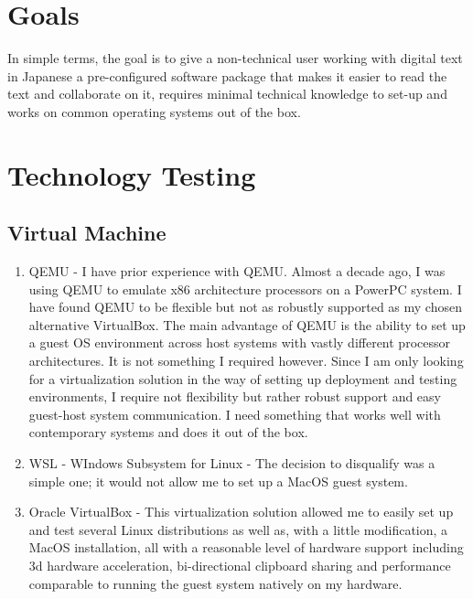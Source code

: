 \documentclass{article}
\begin{document}
\section{Goals}
In simple terms, the goal is to give a non-technical user working with digital text in Japanese a pre-configured software package that makes it easier to read the text and collaborate on it, requires minimal technical knowledge to set-up and works on common operating systems out of the box.

\section {Technology Testing}
\subsection{Virtual Machine}
\begin{enumerate}
    \item QEMU - I have prior experience with QEMU. Almost a decade ago, I was using QEMU to emulate x86 architecture processors on a PowerPC system. I have found QEMU to be flexible but not as robustly supported as my chosen alternative VirtualBox. The main advantage of QEMU is the ability to set up a guest OS environment across host systems with vastly different processor architectures. It is not something I required however. Since I am only looking for a virtualization solution in the way of setting up deployment and testing environments, I require not flexibility but rather robust support and easy guest-host system communication. I need something that works well with contemporary systems and does it out of the box.
    \item WSL - WIndows Subsystem for Linux - The decision to disqualify was a simple one; it would not allow me to set up a MacOS guest system.
    \item Oracle VirtualBox - This virtualization solution allowed me to easily set up and test several Linux distributions as well as, with a little modification, a MacOS installation, all with a reasonable level of hardware support including 3d hardware acceleration, bi-directional clipboard sharing and performance comparable to running the guest system natively on my hardware.
\end{enumerate}
\end{document}
